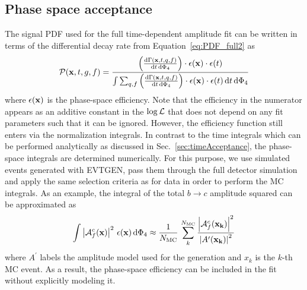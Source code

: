 \clearpage
\subsection{Phase space acceptance}
\label{sec:phasespaceAcceptance}

The signal PDF used for the full time-dependent amplitude fit can be written in terms of the differential decay rate from Equation~\ref{eq:PDF_full2} as
\begin{equation}
	\mathcal P(\mathbf{x},t,g,f) = 
	\frac{ \left( \frac{\text{d}\Gamma(\mathbf{x},t,q,f)}{\text{d}t \, \text{d}\Phi_4} \right) \cdot \epsilon(\mathbf{x}) \cdot \epsilon(t) }{\int \sum_{q,f} \left( \frac{\text{d}\Gamma(\mathbf{x},t,q,f)}{\text{d}t \, \text{d}\Phi_4} \right) \cdot \epsilon(\mathbf{x}) \cdot \epsilon(t) \, \text{d}t \, \text{d}\Phi_{4}  }  
\end{equation}
where $\epsilon(\mathbf{x})$ is the phase-space efficiency. 
Note that the efficiency in the numerator appears as an additive constant in the $\log {\cal L}$ that does not depend on any fit parameters such that it can be ignored.
However, the efficiency function still enters via the normalization integrals. 
In contrast to the time integrals which can be performed analytically as discussed in Sec.~\ref{sec:timeAcceptance},
the phase-space integrals are determined numerically.
For this purpose, we use simulated events generated with \textsf{EVTGEN}, pass them 
through the full detector simulation and apply the same selection criteria as for data 
in order to perform the MC integrals.
As an example, the integral of the total $b \to c$ amplitude squared can be approximated as 
\begin{equation}
	\label{eq:pdfPhspAcc}
	\int \left\vert   \mathcal A^c_{f}(\mathbf{x}) \right\vert^{2} \, \epsilon(\mathbf{x}) \, \text{d}\Phi_{4}   \approx 
	\frac{1}{N_{\rm MC}} \, \sum_{k}^{N_{\rm MC}}    \frac{\left\vert   \mathcal A^c_{f}(\bold{x_{k}}) \right\vert^{2}}
	{\left\vert A^{\prime}(\bold{x_{k}}) \right\vert^{2}}
\end{equation}
where $A^{\prime}$ labels the amplitude model used for the generation and
$x_{k}$ is the $k$-th MC event. As a result, the phase-space efficiency can be included in the  fit without explicitly modeling it.


